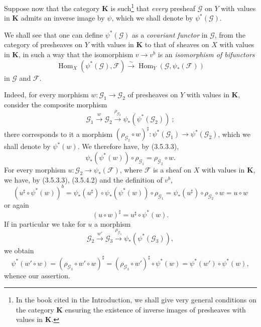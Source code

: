 
\begin{env}[3.5.4]
\label{0.3.5.4}
Suppose now that the category $\mathbf{K}$ is such\footnote{In
the book cited in the Introduction, we shall give very
general conditions on the category $\mathbf{K}$ ensuring the existence of inverse
images of presheaves with values in $\mathbf{K}$.} that \emph{every}
presheaf $\mathcal{G}$ on $Y$ with values in $\mathbf{K}$ admits an
inverse image by $\psi$, which we shall denote by $\psi^*(\mathcal{G})$.

We shall see that one can define $\psi^*(\mathcal{G})$ as a \emph{covariant
functor} in $\mathcal{G}$, from the category of presheaves on $Y$ with
values in $\mathbf{K}$ to that of sheaves on $X$ with values in
$\mathbf{K}$, in such a way that the isomorphism $v\to v^b$ is an
\emph{isomorphism of bifunctors}
\begin{equation*}
  \operatorname{Hom}_X(\psi^*(\mathcal{G}),\mathcal{F})
  \xrightarrow{\sim}
  \operatorname{Hom}_Y(\mathcal{G},\psi_*(\mathcal{F}))
\tag{3.5.4.1}\label{0.3.5.4.1}
\end{equation*}
in $\mathcal{G}$ and $\mathcal{F}$.

Indeed, for every morphism
$w:\mathcal{G}_1\to\mathcal{G}_2$ of presheaves on $Y$ with values in
$\mathbf{K}$, consider the composite morphism
\[
  \mathcal{G}_1\xrightarrow{w}\mathcal{G}_2
  \xrightarrow{\rho_{\mathcal{G}_2}}
  \psi_*(\psi^*(\mathcal{G}_2))~;
\]
there corresponds to it a morphism
$(\rho_{\mathcal{G}_2}\circ w)^\sharp:
\psi^*(\mathcal{G}_1)\to\psi^*(\mathcal{G}_2)$, which we shall denote by
$\psi^*(w)$. We therefore have, by (3.5.3.3),
\begin{equation*}
  \psi_*(\psi^*(w))\circ\rho_{\mathcal{G}_1}
  =\rho_{\mathcal{G}_2}\circ w.
\tag{3.5.4.2}\label{0.3.5.4.2}
\end{equation*}
For every morphism $u:\mathcal{G}_2\to\psi_*(\mathcal{F})$, where
$\mathcal{F}$ is a sheaf on $X$ with values in $\mathbf{K}$, we have,
by (3.5.3.3), (3.5.4.2) and the definition of $v^b$,
\[
  (u^\sharp\circ\psi^*(w))^b
  =\psi_*(u^\sharp)\circ\psi_*(\psi^*(w))\circ\rho_{\mathcal{G}_1}
  =\psi_*(u^\sharp)\circ\rho_{\mathcal{G}_2}\circ w
  =u\circ w
\]
or again
\begin{equation*}
  (u\circ w)^\sharp=u^\sharp\circ\psi^*(w).
\tag{3.5.4.3}\label{0.3.5.4.3}
\end{equation*}
If in particular we take for $u$ a morphism
\[
  \mathcal{G}_2\xrightarrow{w'}\mathcal{G}_3
  \xrightarrow{\rho_{\mathcal{G}_3}}
  \psi_*(\psi^*(\mathcal{G}_3)),
\]
we obtain
\[
  \psi^*(w'\circ w)
  =(\rho_{\mathcal{G}_3}\circ w'\circ w)^\sharp
  =(\rho_{\mathcal{G}_3}\circ w')^\sharp\circ\psi^*(w)
  =\psi^*(w')\circ\psi^*(w),
\]
whence our assertion.


\end{env}

